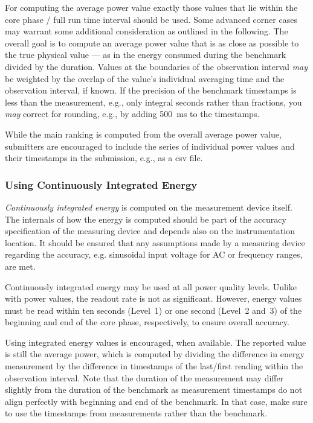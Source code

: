 For computing the average power value exactly those values that lie within the core phase / full run time interval should be used.
Some advanced corner cases may warrant some additional consideration as outlined in the following.
The overall goal is to compute an average power value that is as close as possible to the true physical value --- as in the energy consumed during the benchmark divided by the duration.
Values at the boundaries of the observation interval \emph{may} be weighted by the overlap of the value's individual averaging time and the observation interval, if known.
If the precision of the benchmark timestamps is less than the measurement, e.g., only integral seconds rather than fractions, you \emph{may} correct for rounding, e.g., by adding \SI{500}{\milli\second} to the timestamps.

While the main ranking is computed from the overall average power value, submitters are encouraged to include the series of individual power values and their timestamps in the submission, e.g., as a csv file.

\subsubsection{Using Continuously Integrated Energy}

\emph{Continuously integrated energy} is computed on the measurement device itself.
The internals of how the energy is computed should be part of the accuracy specification of the measuring device and depends also on the instrumentation location.
It should be ensured that any assumptions made by a measuring device regarding the accuracy, e.g. sinusoidal input voltage for AC or frequency ranges, are met.

Continuously integrated energy may be used at all power quality levels.
Unlike with power values, the readout rate is not as significant.
However, energy values must be read within ten seconds (Level~1) or one second (Level~2 and~3) of the beginning and end of the core phase, respectively, to ensure overall accuracy.

Using integrated energy values is encouraged, when available.
The reported value is still the average power, which is computed by dividing the difference in energy measurement by the difference in timestamps of the last/first reading within the observation interval.
Note that the duration of the measurement may differ slightly from the duration of the benchmark as measurement timestamps do not align perfectly with beginning and end of the benchmark.
In that case, make sure to use the timestamps from measurements rather than the benchmark.

